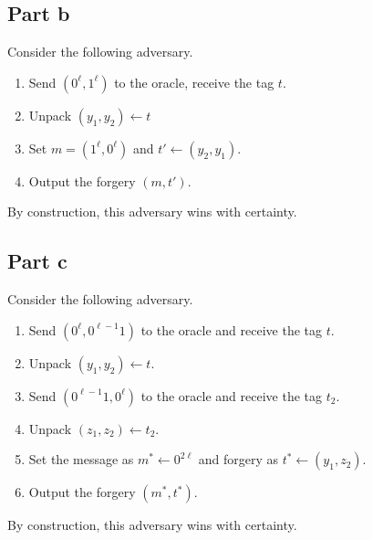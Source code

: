 \documentclass{article}
\theoremstyle{definition}
\begin{document}
\subsection*{Part b}

Consider the following adversary.
\begin{enumerate}
    \item Send $(0^\ell, 1^\ell)$ to the oracle, receive the tag $t$.
    \item Unpack $(y_1, y_2)\gets t$
    \item Set $m=(1^\ell, 0^\ell)$ and $t'\gets (y_2, y_1)$.
    \item Output the forgery $(m, t')$.
\end{enumerate}
By construction, this adversary wins with certainty.

\subsection*{Part c}

Consider the following adversary.
\begin{enumerate}
    \item Send $(0^\ell, 0^{\ell-1}1)$ to the oracle and receive the tag $t$.
    \item Unpack $(y_1, y_2)\gets t$.
    \item Send $(0^{\ell - 1}1, 0^\ell)$ to the oracle and receive the tag $t_2$.
    \item Unpack $(z_1, z_2)\gets t_2$.
    \item Set the message as $m^*\gets 0^{2\ell}$ and forgery as $t^*\gets (y_1, z_2)$.
    \item Output the forgery $(m^*, t^*)$.
\end{enumerate}
By construction, this adversary wins with certainty.
\end{document}
